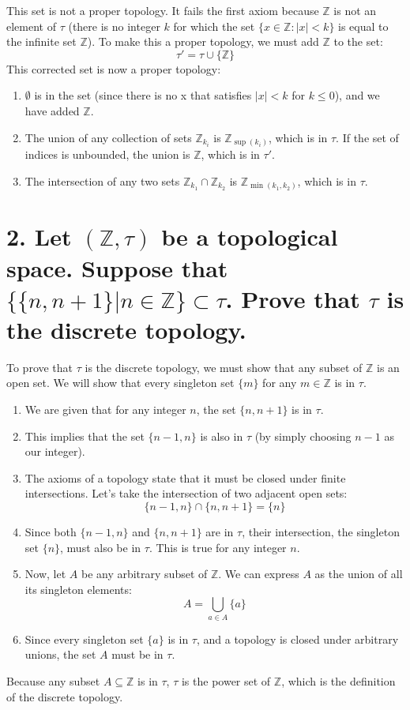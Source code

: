 \documentclass{article}
\begin{document}
This set is not a proper topology.
It fails the first axiom because $\mathbb{Z}$ is not an element of $\tau$ 
(there is no integer $k$ for which the set $\{x \in \mathbb{Z} : |x| < k\}$ is equal to the infinite set $\mathbb{Z}$).
To make this a proper topology, we must add $\mathbb{Z}$ to the set:
$$ \tau' = \tau \cup \{\mathbb{Z}\} $$
This corrected set is now a proper topology:
\begin{enumerate}
    \item $\emptyset$ is in the set (since there is no x that satisfies $|x| < k$ for $k \leq 0$), and we have added $\mathbb{Z}$.
    \item The union of any collection of sets $\mathbb{Z}_{k_i}$ is $\mathbb{Z}_{\sup(k_i)}$, which is in $\tau$. If the set of indices is unbounded, the union is $\mathbb{Z}$, which is in $\tau'$.
    \item The intersection of any two sets $\mathbb{Z}_{k_1} \cap \mathbb{Z}_{k_2}$ is $\mathbb{Z}_{\min(k_1, k_2)}$, which is in $\tau$.
\end{enumerate}

\hrulefill

\section*{2. Let $(\mathbb{Z}, \tau)$ be a topological space. Suppose that $\{\{n,n+1\}|n\in\mathbb{Z}\}\subset\tau$. Prove that $\tau$ is the discrete topology.}

To prove that $\tau$ is the discrete topology, we must show that any subset of $\mathbb{Z}$ is an open set. We will show that every singleton set $\{m\}$ for any $m \in \mathbb{Z}$ is in $\tau$.

\begin{enumerate}
    \item We are given that for any integer $n$, the set $\{n, n+1\}$ is in $\tau$.
    \item This implies that the set $\{n-1, n\}$ is also in $\tau$ (by simply choosing $n-1$ as our integer).
    \item The axioms of a topology state that it must be closed under finite intersections. Let's take the intersection of two adjacent open sets:
    $$ \{n-1, n\} \cap \{n, n+1\} = \{n\} $$
    \item Since both $\{n-1, n\}$ and $\{n, n+1\}$ are in $\tau$, their intersection, the singleton set $\{n\}$, must also be in $\tau$. This is true for any integer $n$.
    \item Now, let $A$ be any arbitrary subset of $\mathbb{Z}$. We can express $A$ as the union of all its singleton elements:
    $$ A = \bigcup_{a \in A} \{a\} $$
    \item Since every singleton set $\{a\}$ is in $\tau$, and a topology is closed under arbitrary unions, the set $A$ must be in $\tau$.
\end{enumerate}
Because any subset $A \subseteq \mathbb{Z}$ is in $\tau$, $\tau$ is the power set of $\mathbb{Z}$, which is the definition of the discrete topology.
\end{document}
